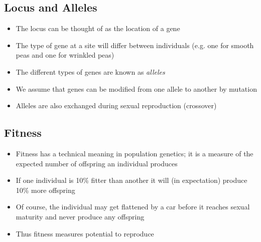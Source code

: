 
\begin{slide}
\section{Locus and Alleles}

\begin{PauseHighLight}
  \begin{itemize}
  \item The locus can be thought of as the location of a gene\pause
  \item The type of gene at a site will differ between individuals
    (e.g. one for smooth peas and one for wrinkled peas)\pause
  \item The different types of genes are known as \emph{alleles}\pause
  \item We assume that genes can be modified from one allele to another
    by mutation\pause
  \item Alleles are also exchanged during sexual reproduction
    (crossover)\pause 
  \end{itemize}
\end{PauseHighLight}

\end{slide}


\begin{slide}
\section{Fitness}

\begin{PauseHighLight}
  \begin{itemize}
  \item Fitness has a technical meaning in population genetics; it
    is a measure of the expected number of offspring an individual
    produces\pause
  \item If one individual is 10\% fitter than another it will (in
    expectation) produce 10\% more offspring\pause
  \item Of course, the individual may get flattened by a car before it
    reaches sexual maturity and never produce any offspring\pause
  \item Thus fitness measures potential to reproduce\pause
  \end{itemize}
\end{PauseHighLight}

\end{slide}


